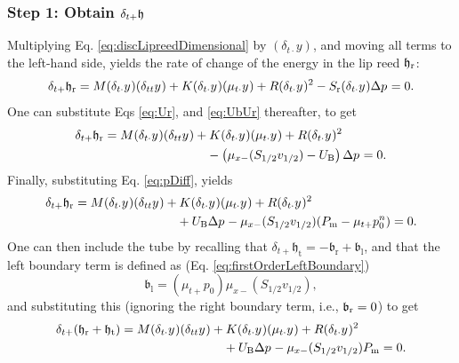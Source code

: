 \subsubsection{Step 1: Obtain $\delta_{t+} \mathfrak{h}$} 
Multiplying Eq. \eqref{eq:discLipreedDimensional} by $(\delta_{t\cdot}y)$, and moving all terms to the left-hand side, yields the rate of change of the energy in the lip reed $\mathfrak{h}_{\text{r}}$:
\begin{equation*}
    \delta_{t+} \mathfrak{h}_{\text{r}} = M(\delta_{t\cdot}y^{})(\delta_{tt}y^{}) + K(\delta_{t\cdot}y^{})(\mu_{t\cdot}y^{}) + R(\delta_{t\cdot}y^{})^2 - S_\text{r}(\delta_{t\cdot}y^{})\Delta p^{} = 0.
\end{equation*}
One can substitute Eqs \eqref{eq:Ur}, and \eqref{eq:UbUr} thereafter, to get
\begin{align*}
    \delta_{t+} \mathfrak{h}_{\text{r}} = M(\delta_{t\cdot}y^{})(\delta_{tt}y^{}) &+ K(\delta_{t\cdot}y^{})(\mu_{t\cdot}y^{}) + R(\delta_{t\cdot}y^{})^2 \\
    &\quad- \left(\mu_{x-}(S_{1/2}v_{1/2})-U_\text{B}\right)\Delta p^{} = 0.
\end{align*}
Finally, substituting Eq. \eqref{eq:pDiff}, yields
\begin{align*}
    \delta_{t+} \mathfrak{h}_{\text{r}} = M(\delta_{t\cdot}y^{})(\delta_{tt}y^{}) &+ K(\delta_{t\cdot}y^{})(\mu_{t\cdot}y^{}) + R(\delta_{t\cdot}y^{})^2 \\
    &\quad+ U_\text{B}\Delta p^{} - \mu_{x-}(S_{1/2}v_{1/2})(P_{\text{m}}-\mu_{t+} p_0^n) = 0.
\end{align*}
One can then include the tube by recalling that $\delta_{t+}\mathfrak{h}_\text{t} = -\mathfrak{b}_\text{r} + \mathfrak{b}_\text{l}$, and that the left boundary term is defined as (Eq. \eqref{eq:firstOrderLeftBoundary})
\begin{equation*}
    \mathfrak{b}_\text{l} = (\mu_{t+}p_0)\mu_{x-}(S_{1/2}v_{1/2}),
\end{equation*} 
and substituting this (ignoring the right boundary term, i.e., $\mathfrak{b}_{\text{r}} = 0$) to get
\begin{align*}
    \delta_{t+} (\mathfrak{h}_{\text{r}} +\mathfrak{h}_{\text{t}}) = M(\delta_{t\cdot}y^{})(\delta_{tt}y^{}) &+ K(\delta_{t\cdot}y^{})(\mu_{t\cdot}y^{}) + R(\delta_{t\cdot}y^{})^2 \\
    &\quad+ U_\text{B}\Delta p^{} - \mu_{x-}(S_{1/2}v_{1/2})P_{\text{m}} = 0.
\end{align*}
